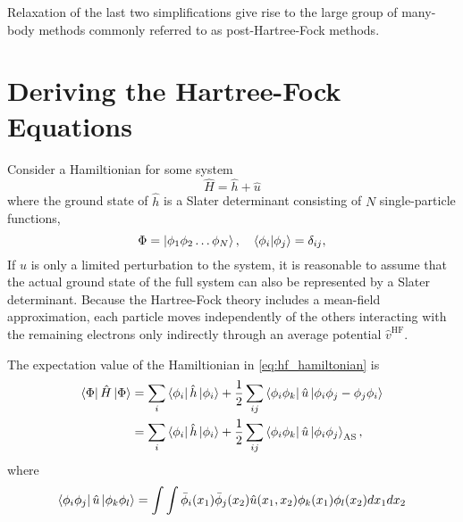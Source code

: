     Relaxation of the last two simplifications give rise to the large group of
    many-body methods commonly referred to as post-Hartree-Fock methods. 

    \section{Deriving the Hartree-Fock Equations}

    Consider a Hamiltionian for some system
    \begin{equation}
        \label{eq:hf_hamiltonian}
        \hat{H} = \hat{h} + \hat{u}
    \end{equation}
    where the ground state of $\hat{h}$ is a Slater determinant consisting 
    of $N$ single-particle functions,
    \begin{equation}
        \Phi = \ket{\phi_1 \phi_2 \dots \phi_N}, \quad 
            \braket{\phi_i}{\phi_j} = \delta_{ij},
    \end{equation} 
    If $\hat{u}$ is 
    only a limited perturbation to the system, it is reasonable to assume that the 
    actual ground state of the full system can also be represented by a Slater 
    determinant. Because the Hartree-Fock theory includes a mean-field approximation,
    each particle moves independently of the others interacting with the remaining
    electrons only indirectly through an average potential $\hat{v}^{\text{HF}}$.

    The expectation value of the Hamiltionian in \autoref{eq:hf_hamiltonian} is 
    \begin{equation}
        \label{eq:hf_energy}
        \begin{aligned}
         \bra{\Phi} \hat{H} \ket{\Phi} 
            &= \sum_i \bra{\phi_i} \hat{h} \ket{\phi_i}
            + \frac{1}{2} \sum_{ij} \bra{\phi_i \phi_k} \hat{u} 
                \ket{\phi_i \phi_j - \phi_j \phi_i} \\
            &= \sum_i \bra{\phi_i} \hat{h} \ket{\phi_i}
            + \frac{1}{2} \sum_{ij} \bra{\phi_i \phi_k} \hat{u} 
                \ket{\phi_i \phi_j}_\text{AS},
        \end{aligned}
    \end{equation}
    where 
    \begin{equation*}
        \bra{\phi_i \phi_j} \hat{u} \ket{\phi_k \phi_l}
         = \int \int \bar{\phi}_i(x_1) \bar{\phi}_j(x_2) 
            \hat{u}(x_1, x_2) \phi_k(x_1) \phi_l(x_2) dx_1 dx_2
    \end{equation*}


